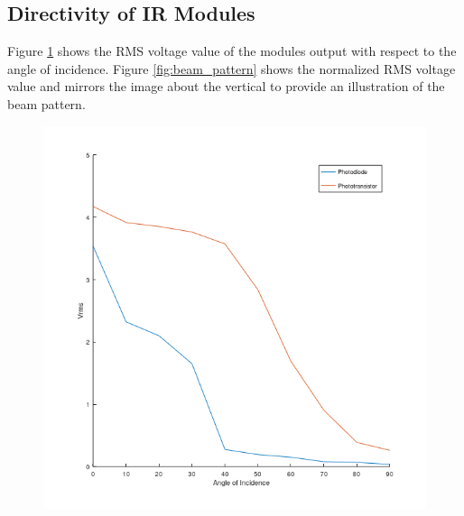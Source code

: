 



\subsection{Directivity of IR Modules}

Figure \ref{fig:vrms_vs_angle_of_incidence} shows the RMS voltage value of the modules output with respect to the angle of incidence. Figure \ref{fig:beam_pattern} shows the normalized RMS voltage value and mirrors the image about the vertical to provide an illustration of the beam pattern.


\begin{figure}[H]
	\centering
	\begin{minipage}{.4\linewidth}
		\centering
		\includegraphics[width=\textwidth]{figures/results/vrms_vs_incidence_square.png}
		\label{fig:vrms_vs_angle_of_incidence}
	\end{minipage}
	\hspace{.1\linewidth}
	\begin{minipage}{.4\linewidth}
		\centering

\end{minipage}
\end{figure}
